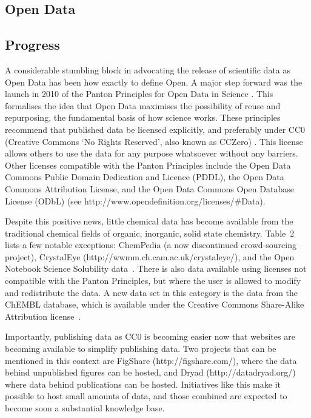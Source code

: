 \documentclass[10pt]{bmc_article}
\newenvironment{bmcformat}{\begin{raggedright}\baselineskip20pt\sloppy\setboolean{publ}{false}}{\end{raggedright}\baselineskip20pt\sloppy}
\begin{document}
\begin{bmcformat}
\section*{Open Data}
  \subsection*{Progress}

A considerable stumbling block in advocating the release of scientific
data as Open Data has been how exactly to define Open. A major step
forward was the launch in 2010 of the Panton Principles for Open Data
in Science \cite{WebPanton}. This formalises the idea that Open Data maximises the
possibility of reuse and repurposing, the fundamental basis
of how science works. These principles recommend that published data
be licensed explicitly, and preferably under CC0 (Creative Commons `No
Rights Reserved', also known as CCZero) \cite{WebCC0}. This license allows others to use the
data for any purpose whatsoever without any barriers. Other licenses
compatible with the Panton Principles include the
Open Data Commons Public Domain Dedication and Licence (PDDL), the
Open Data Commons Attribution License, and the
Open Data Commons Open Database License (ODbL) (see
http://www.opendefinition.org/licenses/\#Data).

Despite this positive news, little chemical data has become
available from the traditional chemical fields of organic,
inorganic, solid state chemistry. Table~2 lists a few notable
exceptions: ChemPedia (a now discontinued crowd-sourcing project),
CrystalEye (http://wwmm.ch.cam.ac.uk/crystaleye/),
and the Open Notebook Science Solubility
data~\cite{ONS2010}. There is also data available using licenses
not compatible with the Panton Principles, but where the user
is allowed to modify and redistribute the data. A new data
set in this category is the data from the ChEMBL database,
which is available under the Creative Commons Share-Alike
Attribution license~\cite{Overington2009}.

Importantly, publishing data as CC0 is becoming easier now that
websites are becoming available to simplify publishing data. Two
projects that can be mentioned in this context are FigShare
(http://figshare.com/), where the data behind unpublished figures
can be hosted, and Dryad (http://datadryad.org/) where data
behind publications can be hosted. Initiatives like this make
it possible to host small amounts of data, and those combined
are expected to become soon a substantial knowledge base.


\end{bmcformat}
\end{document}

